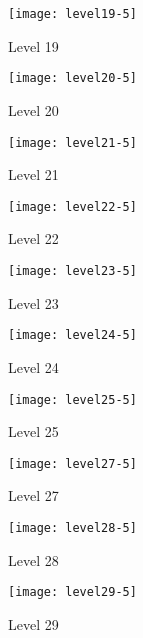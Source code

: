 \begin{figure}
  \centering
  \texttt{[image: level19-5]}
  \caption{Level 19}
  \label{fig:level19-stats}
\end{figure}

\begin{figure}
  \centering
  \texttt{[image: level20-5]}
  \caption{Level 20}
  \label{fig:level20-stats}
\end{figure}

\clearpage
 
\begin{figure}
  \centering
  \texttt{[image: level21-5]}
  \caption{Level 21}
  \label{fig:level21-stats}
\end{figure}

\begin{figure}
  \centering
  \texttt{[image: level22-5]}
  \caption{Level 22}
  \label{fig:level2-stats}
\end{figure}
 
\begin{figure}
  \centering
  \texttt{[image: level23-5]}
  \caption{Level 23}
  \label{fig:level23-stats}
\end{figure}

\begin{figure}
  \centering
  \texttt{[image: level24-5]}
  \caption{Level 24}
  \label{fig:level24-stats}
\end{figure}
 
\begin{figure}
  \centering
  \texttt{[image: level25-5]}
  \caption{Level 25}
  \label{fig:level25-stats}
\end{figure}

\begin{figure}
  \centering
  \texttt{[image: level27-5]}
  \caption{Level 27}
  \label{fig:level27-stats}
\end{figure}
 
\begin{figure}
  \centering
  \texttt{[image: level28-5]}
  \caption{Level 28}
  \label{fig:level28-stats}
\end{figure}

\begin{figure}
  \centering
  \texttt{[image: level29-5]}
  \caption{Level 29}
  \label{fig:level29-stats}
\end{figure}
 
